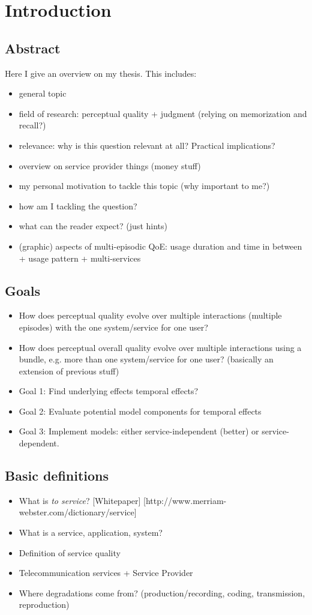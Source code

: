 \chapter{Introduction}
\section*{Abstract}
Here I give an overview on my thesis.
This includes:
\begin{itemize}
\item general topic
\item field of research: perceptual quality + judgment (relying on memorization and recall?)
\item relevance: why is this question relevant at all? Practical implications?
\item overview on service provider things (money stuff)
\item my personal motivation to tackle this topic (why important to me?)
\item how am I tackling the question?
\item what can the reader expect? (just hints)
\item (graphic) aspects of multi-episodic QoE: usage duration and time in between + usage pattern + multi-services
\end{itemize}

\section{Goals}
\begin{itemize}
\item How does perceptual quality evolve over multiple interactions (multiple episodes) with the one system/service for one user?
\item How does perceptual overall quality evolve over multiple interactions using a bundle, e.g. more than one system/service for one user? (basically an extension of previous stuff)
\item Goal 1: Find underlying effects temporal effects? 
\item Goal 2: Evaluate potential model components for temporal effects
\item Goal 3: Implement models: either service-independent (better) or service-dependent.
\end{itemize}

\section{Basic definitions}
\begin{itemize}
\item What is \emph{to service}? [Whitepaper] [http://www.merriam-webster.com/dictionary/service]
\item What is a service, application, system?
\item Definition of service quality
\item Telecommunication services + Service Provider
\item Where degradations come from? (production/recording, coding, transmission, reproduction)
\end{itemize}

